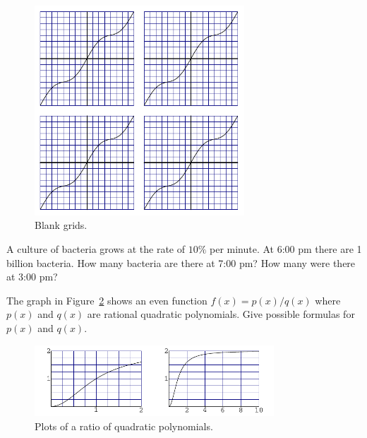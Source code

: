 {\begin{Exercise}
\begin{figure}[tbp]
\begin{center}
\includegraphics[width=0.7\textwidth]{algebra/sets/xsinx_blank}
\end{center}
\caption{Blank grids.}
\label{figure xsinx blank grids}
\end{figure}

\end{Exercise}





\begin{Exercise}
\label{exercise geometric growth bacteria}
A culture of bacteria grows at the rate of $10\%$ per minute.  At 6:00 pm 
there are 1 billion bacteria.  How many bacteria are there at 7:00 pm?
How many were there at 3:00 pm?

\end{Exercise}





\begin{Exercise}
\label{exercise rational quadratic}
The graph in Figure~\ref{figure 2x2x21} shows an even function
$f(x) = p(x) / q(x)$ where $p(x)$ and $q(x)$ are rational quadratic 
polynomials.  Give possible formulas for $p(x)$ and $q(x)$.
\begin{figure}[tpb]
\begin{center}
\includegraphics[width=0.8\textwidth]{algebra/sets/2x2x21}
\end{center}
\caption{Plots of a ratio of quadratic polynomials.}
\label{figure 2x2x21}
\end{figure}


\end{Exercise}}

